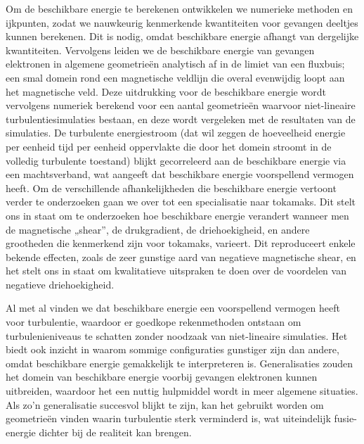 Om de beschikbare energie te berekenen ontwikkelen we numerieke methoden en ijkpunten, zodat we nauwkeurig kenmerkende kwantiteiten voor gevangen deeltjes kunnen berekenen. Dit is nodig, omdat beschikbare energie afhangt van dergelijke kwantiteiten. Vervolgens leiden we de beschikbare energie van gevangen elektronen in algemene geometrieën analytisch af in de limiet van een fluxbuis; een smal domein rond een magnetische veldlijn die overal evenwijdig loopt aan het magnetische veld. Deze uitdrukking voor de beschikbare energie wordt vervolgens numeriek berekend voor een aantal geometrieën waarvoor niet-lineaire turbulentiesimulaties bestaan, en deze wordt vergeleken met de resultaten van de simulaties. De turbulente energiestroom (dat wil zeggen de hoeveelheid energie per eenheid tijd per eenheid oppervlakte die door het domein stroomt in de volledig turbulente toestand) blijkt gecorreleerd aan de beschikbare energie via een machtsverband, wat aangeeft dat beschikbare energie voorspellend vermogen heeft. Om de verschillende afhankelijkheden die beschikbare energie vertoont verder te onderzoeken gaan we over tot een specialisatie naar tokamaks. Dit stelt ons in staat om te onderzoeken hoe beschikbare energie verandert wanneer men de magnetische „shear”, de drukgradient, de driehoekigheid, en andere grootheden die kenmerkend zijn voor tokamaks, varieert. Dit reproduceert enkele bekende effecten, zoals de zeer gunstige aard van negatieve magnetische shear, en het stelt ons in staat om kwalitatieve uitspraken te doen over de voordelen van negatieve driehoekigheid. \par
Al met al vinden we dat beschikbare energie een voorspellend vermogen heeft voor turbulentie, waardoor er goedkope rekenmethoden ontstaan om turbulenieniveaus te schatten zonder noodzaak van niet-lineaire simulaties. Het biedt ook inzicht in waarom sommige configuraties gunstiger zijn dan andere, omdat beschikbare energie gemakkelijk te interpreteren is. Generalisaties zouden het domein van beschikbare energie voorbij gevangen elektronen kunnen uitbreiden, waardoor het een nuttig hulpmiddel wordt in meer algemene situaties. Als zo'n generalisatie succesvol blijkt te zijn, kan het gebruikt worden om geometrieën vinden waarin turbulentie sterk verminderd is, wat uiteindelijk fusie-energie dichter bij de realiteit kan brengen.


\vspace*{11pt}\noindent


